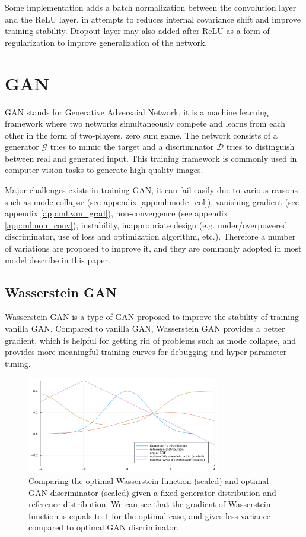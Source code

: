 Some implementation adds a batch normalization between the convolution layer and the ReLU layer, in attempts to reduces internal covariance shift and improve training stability. Dropout layer may also added after ReLU as a form of regularization to improve generalization of the network.

\section{GAN}

GAN stands for Generative Adversaial Network\cite{goodfellowGenerativeAdversarialNetworks2014a}, it is a machine learning framework where two networks simultaneously compete and learns from each other in the form of two-players, zero sum game. The network consists of a generator $\mathcal{G}$ tries to mimic the target and a discriminator $\mathcal{D}$ tries to distinguish between real and generated input. This training framework is commonly used in computer vision tasks to generate high quality images.

Major challenges exists in training GAN, it can fail easily due to various reasons such as mode-collapse (see appendix \ref{app:ml:mode_col}), vanishing gradient (see appendix \ref{app:ml:van_grad}), non-convergence (see appendix \ref{app:ml:non_conv}), instability, inappropriate design (e.g. under/overpowered discriminator, use of loss and optimization algorithm, etc.). Therefore a number of variations are proposed to improve it, and they are commonly adopted in most model describe in this paper.


\subsection{Wasserstein GAN}
Wasserstein GAN\cite{arjovskyWassersteinGAN2017} is a type of GAN proposed to improve the stability of training vanilla GAN. Compared to vanilla GAN, Wasserstein GAN provides a better gradient, which is helpful for getting rid of problems such as mode collapse, and provides more meaningful training curves for debugging and hyper-parameter tuning.

\begin{figure}
    \centering
    \includegraphics[width=0.75\textwidth]{images/preliminary/wgan_vs_gan_grad.png}
    \caption{Comparing the optimal Wasserstein function (scaled) and optimal GAN discriminator (scaled) given a fixed generator distribution and reference distribution. We can see that the gradient of Wasserstein function is equals to $1$ for the optimal case, and gives less variance compared to optimal GAN discriminator.\cite{FileWassersteinGANCritic}} 
    \label{fig:wgan_vs_gan_grad}
\end{figure}


